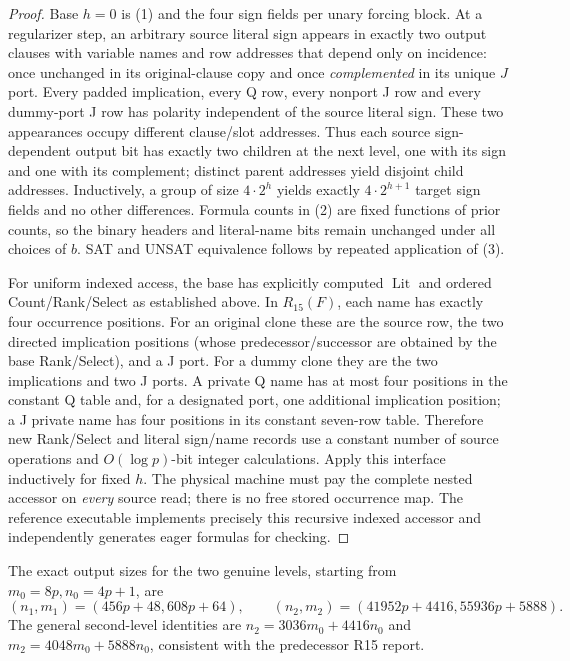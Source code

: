 \documentclass[11pt]{article}
\begin{document}
\begin{proof}
Base $h=0$ is (1) and the four sign fields per unary forcing block. At a regularizer step, an arbitrary source literal sign appears in exactly two output clauses with variable names and row addresses that depend only on incidence: once unchanged in its original-clause copy and once \emph{complemented} in its unique $J$ port. Every padded implication, every Q row, every nonport J row and every dummy-port J row has polarity independent of the source literal sign. These two appearances occupy different clause/slot addresses. Thus each source sign-dependent output bit has exactly two children at the next level, one with its sign and one with its complement; distinct parent addresses yield disjoint child addresses. Inductively, a group of size $4\cdot2^h$ yields exactly $4\cdot2^{h+1}$ target sign fields and no other differences. Formula counts in (2) are fixed functions of prior counts, so the binary headers and literal-name bits remain unchanged under all choices of $b$. SAT and UNSAT equivalence follows by repeated application of (3).

For uniform indexed access, the base has explicitly computed $\operatorname{Lit}$ and ordered Count/Rank/Select as established above. In $R_{15}(F)$, each name has exactly four occurrence positions. For an original clone these are the source row, the two directed implication positions (whose predecessor/successor are obtained by the base Rank/Select), and a J port. For a dummy clone they are the two implications and two J ports. A private Q name has at most four positions in the constant Q table and, for a designated port, one additional implication position; a J private name has four positions in its constant seven-row table. Therefore new Rank/Select and literal sign/name records use a constant number of source operations and $O(\log p)$-bit integer calculations. Apply this interface inductively for fixed $h$. The physical machine must pay the complete nested accessor on \emph{every} source read; there is no free stored occurrence map. The reference executable implements precisely this recursive indexed accessor and independently generates eager formulas for checking.
\end{proof}

The exact output sizes for the two genuine levels, starting from $m_0=8p,n_0=4p+1$, are
\[
 (n_1,m_1)=(456p+48,608p+64),\qquad
 (n_2,m_2)=(41952p+4416,55936p+5888).
\tag{4}
\]
The general second-level identities are $n_2=3036m_0+4416n_0$ and $m_2=4048m_0+5888n_0$, consistent with the predecessor R15 report.
\end{document}
